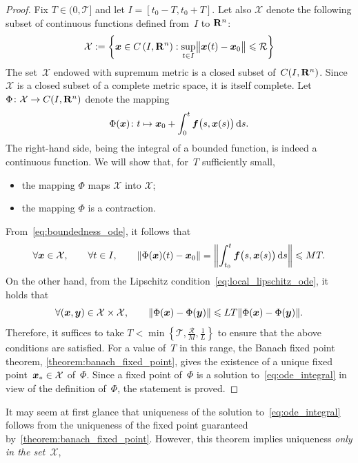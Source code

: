 \begin{proof}
    Fix $T \in (0, \mathcal T]$ and let $I = [t_0 - T, t_0 + T]$.
    Let also $\mathcal X$ denote the following subset of continuous functions defined from~$I$ to $\real^n$:
    \[
    \mathcal X := \left\{ \vect x\in C\left(I, \real^n\right) : \sup_{t \in I} \norm[\big]{\vect x(t) - \vect x_0} \leq \mathcal R \right\}
    \]
    The set~$\mathcal X$ endowed with supremum metric is a closed subset of~$C(I, \real^n)$.
    Since $\mathcal X$ is a closed subset of a complete metric space,
    it is itself complete.
    Let $\Phi \colon \mathcal X \to C(I, \real^n)$ denote the mapping
    \[
        \Phi(\vect x) \colon  t \mapsto  \vect x_0 + \int_{0}^{t} \vect f\bigl(s, \vect x(s)\bigr) \, \d s.
    \]
    The right-hand side, being the integral of a bounded function,
    is indeed a continuous function.
    We will show that, for~$T$ sufficiently small,
    \begin{itemize}
        \item the mapping $\Phi$ maps $\mathcal X$ into $\mathcal X$;
        \item the mapping $\Phi$ is a contraction.
    \end{itemize}
    From~\eqref{eq:boundedness_ode},
    it follows that
    \[
        \forall \vect x \in \mathcal X, \qquad
        \forall t \in I, \qquad
        \vecnorm*{\Phi(\vect x)(t) - \vect x_0} = \vecnorm*{ \int_{t_0}^{t} \vect f\bigl(s, \vect x(s)\bigr) \, \d s }
        \leq M T.
    \]
    On the other hand, from the Lipschitz condition~\eqref{eq:local_lipschitz_ode},
    it holds that
    \[
        \forall (\vect x, \vect y) \in \mathcal X \times \mathcal X, \qquad
        \norm{\Phi(\vect x) - \Phi(\vect y)} \leq L T \norm{\Phi(\vect x) - \Phi(\vect y)}.
    \]
    Therefore, it suffices to take $T < \min \left\{ \mathcal T, \frac{\mathcal R}{M}, \frac{1}{L} \right\}$ to ensure that the above conditions are satisfied.
    For a value of~$T$ in this range,
    the Banach fixed point theorem, \cref{theorem:banach_fixed_point},
    gives the existence of a unique fixed point~$\vect x_* \in \mathcal X$ of~$\Phi$.
    Since a fixed point of~$\Phi$ is a solution to~\eqref{eq:ode_integral} in view of the definition of~$\Phi$,
    the statement is proved.
\end{proof}
It may seem at first glance that uniqueness of the solution to~\eqref{eq:ode_integral} follows from the uniqueness of the fixed point guaranteed by~\cref{theorem:banach_fixed_point}.
However, this theorem implies uniqueness \emph{only in the set~$\mathcal X$},
